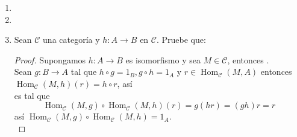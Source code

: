 \documentclass{article}
\begin{document}
\begin{enumerate}
\begin{proof}
y rotando dos veces a la izquierda cada uno por ( TR2 ) sobre $\triangle$ se obtienen $\alpha_0,\beta_0$ y $\gamma_0$ respectivamente, los cuales por 
definición serán elementos de $\tilde{\triangle}$.\\

Como $(\mathscr{C},T,\triangle)$ es categoría triangulada, por el axioma del octaedro existen $g:X'\to Y'$ y $f:Y'\to Z'$ tales que hacen conmutar
 el diagrama (2) y . Así\\
, 
y $f^{op},g^{op}$ hacen conmutar el diagrama (1), pues:
\begin{itemize}
\item[$\bullet$] $f^{op}i^{op}=(if)^{op}=(vk)^{op}=k^{op}v^{op}$\,.
\item[$\bullet$] $-i'=f\circ (-k')$ entonces $(-i')^{op}=(f\circ (-k'))^{op}=-(k')^{op}f^{op}$\\ así $i^{op}=k'^{op}f^{op}$.
\item[$\bullet$] $g^{op}k^{op}=(kg)^{op}=(r)^{op}$.
\item[$\bullet$] $j^{op}g^{op}=(gj)^{op}=(kT^{-1}(u))^{op}=(T^{-1}(u))^{op}k^{op}=\tilde{T}(u^{op})k^{op}$.
\end{itemize}

\end{proof}


\item
\item
\item Sean $\mathscr{C}$ una categoría y $h:A\to B$ en $\mathscr{C}$. Pruebe que: \\
\centerline{
}
\begin{proof}
Supongamos $h:A\to B$ es isomorfismo y sea $M\in \mathscr{C}$, entonces 
. \\Sean $g: B\to A$ tal que $h\circ g=1_B, g\circ h=1_A$ y $r\in \operatorname{Hom}_{\mathscr{C}}(M,A)$
entonces \\$\operatorname{Hom}_{\mathscr{C}}(M,h)(r)=h\circ r$, así 
 \\es tal que 
\[ \operatorname{Hom}_{\mathscr{C}}(M,g)\circ\operatorname{Hom}_{\mathscr{C}}(M,h)(r)=g(hr)=(gh)r=r
\]
así $\operatorname{Hom}_{\mathscr{C}}(M,g)\circ\operatorname{Hom}_{\mathscr{C}}(M,h)=1_A$.\\


\end{proof}
\end{enumerate}
\end{document}
